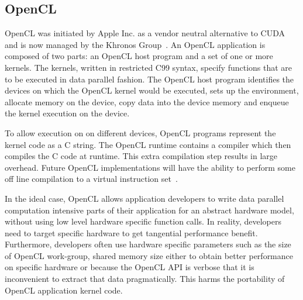 
\subsection{OpenCL}

OpenCL was initiated by Apple Inc. as a vendor neutral alternative
to CUDA and is now managed by the Khronos Group~\cite{OpenCL_kh}.
An OpenCL application is composed of two parts: an OpenCL host program and a
set of one or more kernels. The kernels, written in restricted C99 syntax,
specify functions that are to be executed in data parallel fashion. The OpenCL
host program identifies the devices on which the OpenCL kernel would be
executed, sets up the environment, allocate memory on the device, copy data
into the device memory and enqueue the kernel execution on the device.


To allow execution on on different devices, OpenCL programs represent the kernel
	code as a C string.
The OpenCL runtime contains a compiler which then compiles the C code at runtime.
This extra compilation step results in large overhead. Future OpenCL implementations
will have the ability to perform some off line compilation to a virtual instruction
set~\cite{SPIR}.

In the ideal case, OpenCL allows application developers to write
data parallel computation intensive parts of their application for an abstract
hardware model, without using low level hardware specific function calls.
In reality, developers need to target specific hardware to get tangential
performance benefit. Furthermore, developers often use hardware specific 
parameters such as the size of OpenCL work-group, shared memory size either 
to obtain better performance on specific hardware or because the OpenCL API
is verbose that it is inconvenient to extract that data pragmatically.
This harms the portability of OpenCL application kernel code.

